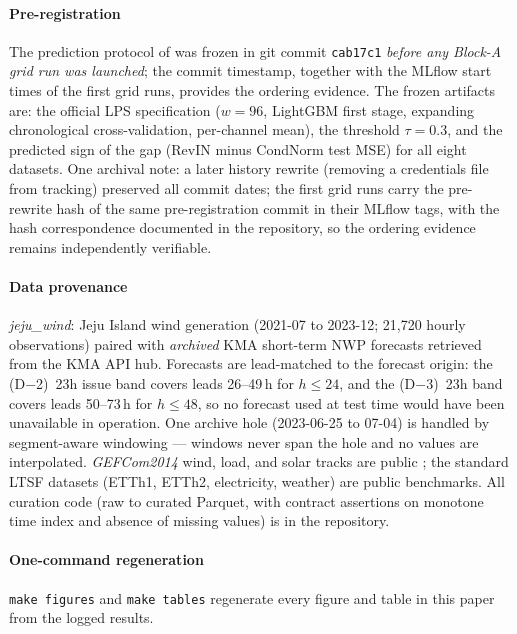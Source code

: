 \paragraph{Pre-registration}
The prediction protocol of  was frozen in git commit
\texttt{cab17c1} \emph{before any Block-A grid run was launched}; the commit
timestamp, together with the MLflow start times of the first grid runs,
provides the ordering evidence. The frozen artifacts are: the official LPS
specification ($w=96$, LightGBM first stage, expanding chronological
cross-validation, per-channel mean), the threshold $\tau = 0.3$, and the
predicted sign of the gap (RevIN minus CondNorm test MSE) for all eight
datasets. One archival note: a later history rewrite (removing a credentials
file from tracking) preserved all commit dates; the first grid runs carry the
pre-rewrite hash of the same pre-registration commit in their MLflow tags,
with the hash correspondence documented in the repository, so the ordering
evidence remains independently verifiable.

\paragraph{Data provenance}
\emph{jeju\_wind}: Jeju Island wind generation (2021-07 to 2023-12; 21{,}720
hourly observations) paired with \emph{archived} KMA short-term NWP forecasts
retrieved from the KMA API hub. Forecasts are lead-matched to the forecast
origin: the (D$-$2)~23h issue band covers leads 26--49\,h for $h \le 24$, and
the (D$-$3)~23h band covers leads 50--73\,h for $h \le 48$, so no forecast
used at test time would have been unavailable in operation. One archive hole
(2023-06-25 to 07-04) is handled by segment-aware windowing --- windows never
span the hole and no values are interpolated. \emph{GEFCom2014} wind, load,
and solar tracks are public \citep{hong2016gefcom}; the standard LTSF datasets
(ETTh1, ETTh2, electricity, weather) are public benchmarks. All curation code
(raw to curated Parquet, with contract assertions on monotone time index and
absence of missing values) is in the repository.

\paragraph{One-command regeneration}
\texttt{make figures} and \texttt{make tables} regenerate every figure and
table in this paper from the logged results.

